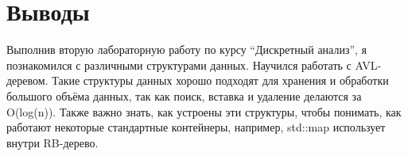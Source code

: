 \section{Выводы}
Выполнив вторую лабораторную работу по курсу \enquote{Дискретный анализ}, я познакомился с различными структурами данных.
Научился работать с AVL-деревом. Такие структуры данных хорошо подходят для хранения и обработки большого объёма данных, так как поиск,
вставка и удаление делаются за O(log(n)). Также важно знать, как устроены эти структуры, чтобы понимать, как работают
некоторые стандартные контейнеры, например, std::map использует внутри RB-дерево.
\pagebreak
